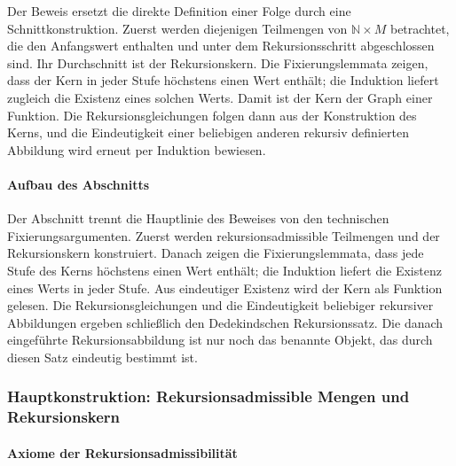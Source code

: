 \documentclass[main.tex]{subfiles}
\begin{document}
Der Beweis ersetzt die direkte Definition einer Folge durch eine
Schnittkonstruktion. Zuerst werden diejenigen Teilmengen von
\(\mathbb{N}\times M\) betrachtet, die den Anfangswert enthalten und unter dem
Rekursionsschritt abgeschlossen sind. Ihr Durchschnitt ist der Rekursionskern.
Die Fixierungslemmata zeigen, dass der Kern in jeder Stufe höchstens einen
Wert enthält; die Induktion liefert zugleich die Existenz eines solchen Werts.
Damit ist der Kern der Graph einer Funktion. Die Rekursionsgleichungen folgen
dann aus der Konstruktion des Kerns, und die Eindeutigkeit einer beliebigen
anderen rekursiv definierten Abbildung wird erneut per Induktion bewiesen.

\paragraph{Aufbau des Abschnitts}

Der Abschnitt trennt die Hauptlinie des Beweises von den technischen
Fixierungsargumenten. Zuerst werden rekursionsadmissible Teilmengen und der
Rekursionskern konstruiert. Danach zeigen die Fixierungslemmata, dass jede
Stufe des Kerns höchstens einen Wert enthält; die Induktion liefert die
Existenz eines Werts in jeder Stufe. Aus eindeutiger Existenz wird der Kern als
Funktion gelesen. Die Rekursionsgleichungen und die Eindeutigkeit beliebiger
rekursiver Abbildungen ergeben schließlich den Dedekindschen Rekursionssatz.
Die danach eingeführte Rekursionsabbildung ist nur noch das benannte Objekt,
das durch diesen Satz eindeutig bestimmt ist.

\subsubsection{Hauptkonstruktion: Rekursionsadmissible Mengen und Rekursionskern}

\paragraph{Axiome der Rekursionsadmissibilität}



\end{document}
